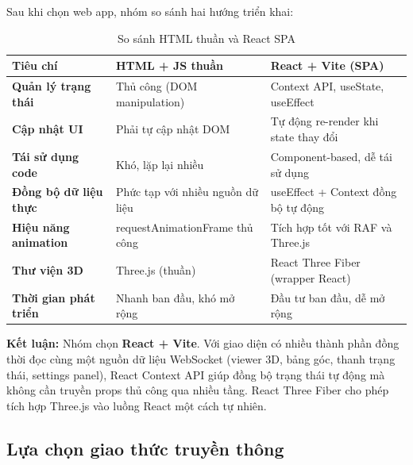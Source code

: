             \hspace{0.5cm} Sau khi chọn web app, nhóm so sánh hai hướng triển khai:

            \begin{table}[H]
            \centering
            \caption{So sánh HTML thuần và React SPA}
            \label{tab:web_framework}
            \begin{tabular}{|>{\centering\arraybackslash}m{3.5cm}|>{\centering\arraybackslash}m{5cm}|>{\centering\arraybackslash}m{5cm}|}
            \hline
            \textbf{Tiêu chí} & \textbf{HTML + JS thuần} & \textbf{React + Vite (SPA)} \\
            \hline
            \textbf{Quản lý trạng thái} & Thủ công (DOM manipulation) & Context API, useState, useEffect \\
            \hline
            \textbf{Cập nhật UI} & Phải tự cập nhật DOM & Tự động re-render khi state thay đổi \\
            \hline
            \textbf{Tái sử dụng code} & Khó, lặp lại nhiều & Component-based, dễ tái sử dụng \\
            \hline
            \textbf{Đồng bộ dữ liệu thực} & Phức tạp với nhiều nguồn dữ liệu & useEffect + Context đồng bộ tự động \\
            \hline
            \textbf{Hiệu năng animation} & requestAnimationFrame thủ công & Tích hợp tốt với RAF và Three.js \\
            \hline
            \textbf{Thư viện 3D} & Three.js (thuần) & React Three Fiber (wrapper React) \\
            \hline
            \textbf{Thời gian phát triển} & Nhanh ban đầu, khó mở rộng & Đầu tư ban đầu, dễ mở rộng \\
            \hline
            \end{tabular}
            \end{table}

            \textbf{Kết luận:} Nhóm chọn \textbf{React + Vite}. Với giao diện có nhiều thành phần đồng thời đọc cùng một nguồn dữ liệu WebSocket (viewer 3D, bảng góc, thanh trạng thái, settings panel), React Context API giúp đồng bộ trạng thái tự động mà không cần truyền props thủ công qua nhiều tầng. React Three Fiber cho phép tích hợp Three.js vào luồng React một cách tự nhiên.

        \subsection{Lựa chọn giao thức truyền thông}

